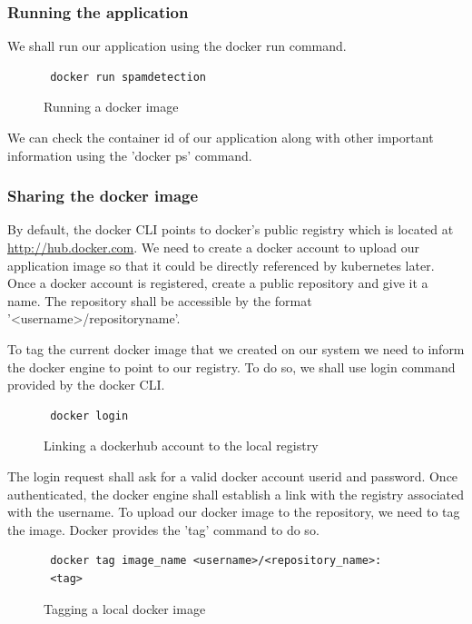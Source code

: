 \documentclass[9pt,twocolumn,twoside]{../../styles/osajnl}
\begin{document}
\subsubsection{Running the application}

We shall run our application using the docker run command.

\begin{figure}[H]
\begin{verbatim}
 docker run spamdetection
\end{verbatim}
\caption{Running a docker image}
\label{Running a docker image}
\end{figure}

We can check the container id of our application along with other
important information using the 'docker ps' command.
 
\subsubsection{Sharing the docker image}

By default, the docker CLI points to docker's public registry which is
located at \url{http://hub.docker.com}. We need to create a docker
account to upload our application image so that it could be directly
referenced by kubernetes later. Once a docker account is registered,
create a public repository and give it a name. The repository shall be
accessible by the format '<username>/repositoryname'.

To tag the current docker image that we created on our system we need
to inform the docker engine to point to our registry. To do so, we
shall use login command provided by the docker CLI.

\begin{figure}[H]
\begin{verbatim}
 docker login
\end{verbatim}
\caption{Linking a dockerhub account to the local registry}
\label{Linking a dockerhub account to the local registry}
\end{figure}

The login request shall ask for a valid docker account userid and
password. Once authenticated, the docker engine shall establish a link
with the registry associated with the username.  To upload our docker
image to the repository, we need to tag the image. Docker provides the
'tag' command to do so.

\begin{figure}[H]
\begin{verbatim}
 docker tag image_name <username>/<repository_name>:
 <tag>
\end{verbatim}
\caption{Tagging a local docker image}
\label{Tagging a local docker image}
\end{figure}
\end{document}
